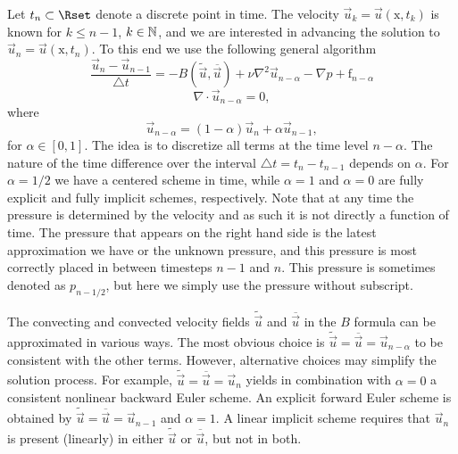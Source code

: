 Let $t_n \subset \Rset$ denote a discrete point in time. The velocity $\vec{u}_k=\vec{u}(\text{x},t_k)$ is known for $k\leq n-1$, $k \in \mathbb{N}$, and we are interested in advancing the solution to $\vec{u}_{n}=\vec{u}(\text{x},t_{n})$. To this end we use the following general algorithm
\begin{equation}
\label{eq:NS_d} \frac{\vec{u}_{n}-\vec{u}_{n-1}}{\triangle t} = - B(\tilde{\vec{u}},\overline{\vec{u}}) + \nu \nabla^2 \vec{u}_{n-\alpha} -\nabla p + \text{f}_{n-\alpha}
\end{equation}
\begin{equation}
 \label{eq:cont_d} \nabla \cdot \vec{u}_{n-\alpha} =0,
\end{equation}
where 
\[ \vec{u}_{n-\alpha}=(1-\alpha) \vec{u}_{n} + \alpha \vec{u}_{n-1},\]
for $\alpha \in [0,1]$.
The idea is to discretize all terms
at the time level $n-\alpha$. The nature of the time difference 
over
the interval $\triangle t = t_{n}-t_{n-1}$ depends
on $\alpha$. For $\alpha =1/2$ we have a centered scheme in time, while
$\alpha =1$ and $\alpha=0$ are fully explicit and fully implicit schemes, 
respectively. Note that at any time the pressure is determined by the velocity and as such it is not directly a function of time. The pressure that appears on the right hand side is the latest approximation we have or the unknown pressure, and this pressure is most correctly placed in between timesteps $n-1$ and $n$. This pressure is sometimes denoted as $p_{n-1/2}$, but here we simply use the pressure without subscript.

The convecting and convected velocity fields $\tilde{\vec{u}}$ and $\overline{\vec{u}}$ in the
$B$ formula can be approximated in various ways. The most obvious
choice is $\tilde{\vec{u}}=\overline{\vec{u}}=\vec{u}_{n-\alpha}$ to
be consistent with the other terms. However, alternative choices
may simplify the solution process.
For example,
$\tilde{\vec{u}}=\overline{\vec{u}}=\vec{u}_{n}$ yields in
combination with $\alpha=0$ a consistent
nonlinear backward Euler scheme. An explicit forward Euler scheme is
obtained by
$\tilde{\vec{u}}
= \overline{\vec{u}} = \vec{u}_{n-1}$ and $\alpha =1$. 
A linear implicit scheme requires that $\vec{u}_{n}$ is present
(linearly) in either $\tilde{\vec{u}}$ or $\overline{\vec{u}}$, but
not in both. 


